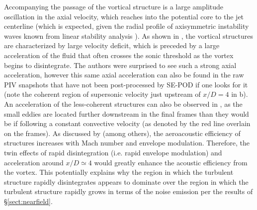 Accompanying the passage of the vortical structure is a large amplitude oscillation in the axial velocity, which reaches into the potential core to the jet centerline (which is expected, given the radial profile of axisymmetric instability waves known from linear stability analysis \citep{Michalke1965}).
As shown in , the vortical structures are characterized by large velocity deficit, which is preceded by a large acceleration of the fluid that often crosses the sonic threshold as the vortex begins to disintegrate.
The authors were surprised to see such a strong axial acceleration, however this same axial acceleration can also be found in the raw PIV snapshots that have not been post-processed by SE-POD if one looks for it (note the coherent region of supersonic velocity just upstream of $x/D = 4$ in b).
An acceleration of the less-coherent structures can also be observed in , as the small eddies are located further downstream in the final frames than they would be if following a constant convective velocity (as denoted by the red line overlain on the frames).
As discussed by \citet{Tam1996} (among others), the aeroacoustic efficiency of structures increases with Mach number and envelope modulation.
Therefore, the twin effects of rapid disintegration (i.e. rapid envelope modulation) and acceleration around $x/D \simeq 4$ would greatly enhance the acoustic efficiency from the vortex.
This potentially explains why the region in which the turbulent structure rapidly disintegrates appears to dominate over the region in which the turbulent structure rapidly grows in terms of the noise emission per the results of \S\ref{sect:nearfield}.
